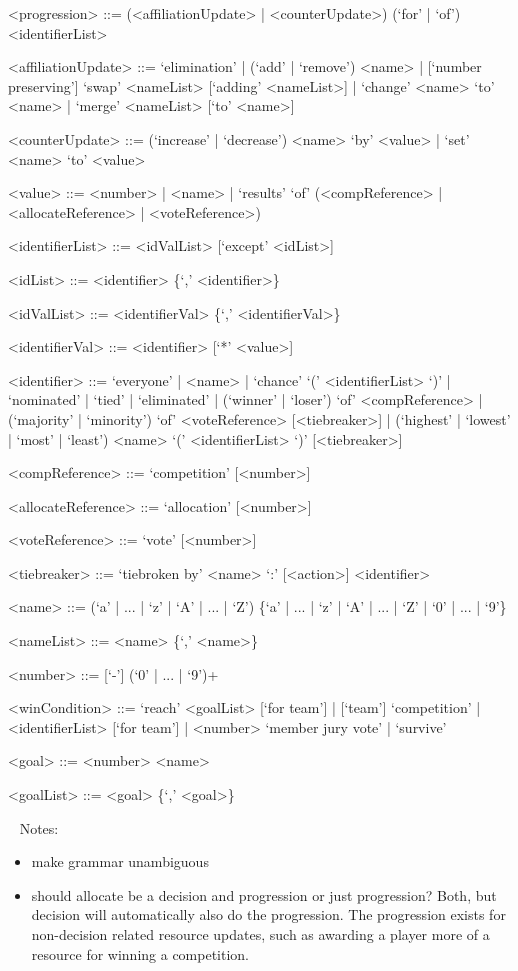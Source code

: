 \documentclass{article}
\begin{document}
\begin{grammar}
<progression> ::= (<affiliationUpdate> | <counterUpdate>) (`for' | `of') 
<identifierList>

<affiliationUpdate> ::= `elimination' | (`add' | `remove') <name> | 
[`number preserving'] `swap' <nameList> [`adding' <nameList>] | `change' <name> 
`to' <name> | `merge' <nameList> [`to' <name>]

<counterUpdate> ::= (`increase' | `decrease') <name> `by' <value> | `set' 
<name> `to' <value> 

<value> ::= <number> | <name> | `results' `of' (<compReference> | 
<allocateReference> |
<voteReference>) %

<identifierList> ::= <idValList> [`except' <idList>]

<idList> ::= <identifier> \{`,' <identifier>\}

<idValList> ::= <identifierVal> \{`,' <identifierVal>\}

<identifierVal> ::= <identifier> [`*' <value>]

<identifier> ::= `everyone' | <name> | `chance' `(' <identifierList> `)' | 
`nominated' 
| 
`tied' | 
`eliminated' | (`winner' | `loser') `of' <compReference> | (`majority' | 
`minority') `of' <voteReference>  [<tiebreaker>] | (`highest' | `lowest' | 
`most' | `least') <name> `(' <identifierList> `)' [<tiebreaker>]

<compReference> ::= `competition' [<number>] 

<allocateReference> ::= `allocation' [<number>]

<voteReference> ::= `vote' [<number>]

<tiebreaker> ::= `tiebroken by' <name> `:' [<action>] <identifier>

<name> ::= (`a' | ... | `z' | `A' | ... | `Z') \{`a' | ... | `z' | `A' | ... | 
`Z' | `0' | ... | `9'\}

<nameList> ::= <name> \{`,' <name>\}

<number> ::= [`-'] (`0' | ... | `9')+

<winCondition> ::= `reach' <goalList> [`for team']  | [`team'] 
`competition' | <identifierList> [`for team'] | 
<number> `member jury vote' | `survive'

<goal> ::= <number> <name>

<goalList> ::= <goal> \{`,' <goal>\}

\end{grammar}

~\newline
Notes:
\begin{itemize}
	\item make grammar unambiguous
	\item should allocate be a decision and progression or just progression? 
	Both, but decision will automatically also do the progression. The 
	progression exists for non-decision related resource updates, such as 
	awarding a player more of a resource for winning a competition.
\end{itemize}
\end{document}
